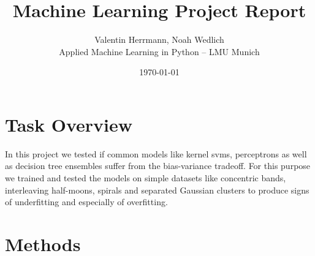 \documentclass[11pt]{article}
\title{\textbf{Machine Learning Project Report}}
\author{Valentin Herrmann, Noah Wedlich \\
Applied Machine Learning in Python – LMU Munich}
\date{\today}
\begin{document}

\maketitle

\section{Task Overview}

In this project we tested if common models like kernel svms, perceptrons as well as decision tree ensembles suffer from the bias-variance tradeoff. For this purpose we trained and tested the models on simple datasets like concentric bands, interleaving half-moons, spirals and separated Gaussian clusters to produce signs of underfitting and especially of overfitting.

\section{Methods}


\end{document}
